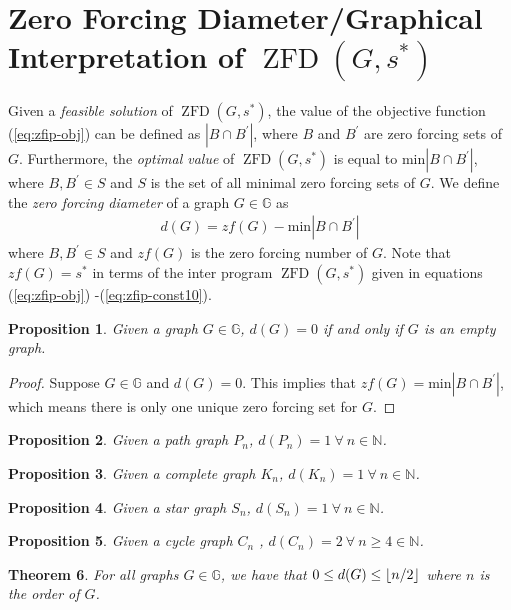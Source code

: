 \documentclass{article}
\DeclarePairedDelimiter\floor{\lfloor}{\rfloor}
\newcommand\zfd[1]{\operatorname{ZFD}\left(#1\right)}
\newtheorem{theorem}{Theorem}[section]
\newtheorem{proposition}[theorem]{Proposition}
\theoremstyle{definition}
\begin{document}
\section{Zero Forcing Diameter/Graphical Interpretation of $\zfd{G,s^{*}}$}\label{sec:zfdiam}
 Given a \textit{feasible solution} of $\zfd{G,s^{*}}$, the value of the objective function (\ref{eq:zfip-obj}) can be defined as $|B \cap B^{'}|$, where $B$ and $B^{'}$ are zero forcing sets of $G$.
Furthermore, the \textit{optimal value} of $\zfd{G,s^{*}}$ is equal to $\text{min}|B \cap B^{'}|$, where $B,B^{'} \in S$ and $S$ is the set of all minimal zero forcing sets of $G$.
We define the \textit{zero forcing diameter} of a graph $G \in \mathbb{G}$ as 
\begin{align}
d(G) = zf(G) - \text{min}|B \cap B^{'}|
\end{align}
 where $B,B^{'} \in S$ and $zf(G)$ is the zero forcing number of $G$.
Note that $zf(G) = s^{*}$ in terms of the inter program $\zfd{G,s^{*}}$ given in equations (\ref{eq:zfip-obj}) -(\ref{eq:zfip-const10}).

\begin{proposition}
Given a graph $G \in \mathbb{G}$, $d(G) = 0$ if and only if $G$ is an empty graph.
\end{proposition}
\begin{proof}
Suppose $G \in \mathbb{G}$ and $d(G) = 0$.
This implies that $zf(G) = \text{min}|B \cap B^{'}|$, which means there is only one unique zero forcing set for $G$.
\end{proof}

\begin{proposition}
Given a path graph $P_n$, $d(P_n)=1 \ \forall \ n \in \mathbb{N}$.
\end{proposition}

\begin{proposition}
Given a complete graph $K_n$, $d(K_n)=1 \ \forall \ n \in \mathbb{N}$.
\end{proposition}

\begin{proposition}
Given a star graph $S_n$, $d(S_n)=1 \ \forall \ n \in \mathbb{N}$.
\end{proposition}

\begin{proposition}
Given a cycle graph $C_n$ , $d(C_n)=2 \ \forall \ n \geq 4 \in \mathbb{N}$.
\end{proposition}

\begin{theorem}
For all graphs $G \in \mathbb{G}$, we have that $0 \leq d(G) \leq \floor{n/2}$ where $n$ is the order of $G$.
\end{theorem}
\end{document}
